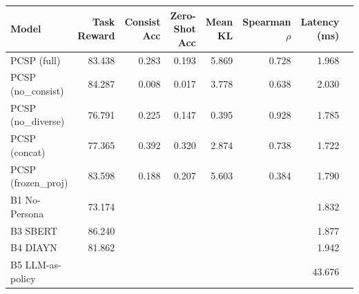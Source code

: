 \begin{tabular}{lrrrrrrr}
\toprule
Model & Task Reward & Consist Acc & Zero-Shot Acc & Mean KL & Spearman $\rho$ & Latency (ms) \\
\midrule
  PCSP (full) & 83.438 & 0.283 & 0.193 & 5.869 & 0.728 & 1.968 \\
  PCSP (no_consist) & 84.287 & 0.008 & 0.017 & 3.778 & 0.638 & 2.030 \\
  PCSP (no_diverse) & 76.791 & 0.225 & 0.147 & 0.395 & 0.928 & 1.785 \\
  PCSP (concat) & 77.365 & 0.392 & 0.320 & 2.874 & 0.738 & 1.722 \\
  PCSP (frozen_proj) & 83.598 & 0.188 & 0.207 & 5.603 & 0.384 & 1.790 \\
  B1 No-Persona & 73.174 & {} & {} & {} & {} & 1.832 \\
  B3 SBERT & 86.240 & {} & {} & {} & {} & 1.877 \\
  B4 DIAYN & 81.862 & {} & {} & {} & {} & 1.942 \\
  B5 LLM-as-policy & {} & {} & {} & {} & {} & 43.676 \\
\bottomrule
\end{tabular}